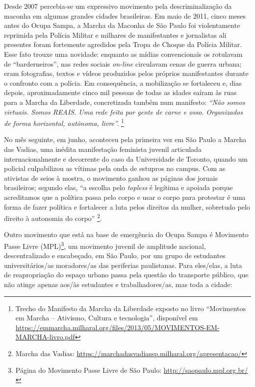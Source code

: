 Desde 2007 percebia-se um expressivo movimento pela descriminalização da
maconha em algumas grandes cidades brasileiras. Em maio de 2011, cinco
meses antes do Ocupa Sampa, a Marcha da Maconha de São Paulo foi
violentamente reprimida pela Polícia Militar e milhares de manifestantes
e jornalistas ali presentes foram fortemente agredidos pela Tropa de
Choque da Polícia Militar. Esse fato trouxe uma novidade: enquanto as
mídias convencionais os rotulavam de ``barderneiros'', nas redes sociais
\emph{on-line} circulavam cenas de guerra urbana; eram fotografias,
textos e vídeos produzidos pelos próprios manifestantes durante o
confronto com a polícia. Em consequência, a mobilização se fortaleceu e,
dias depois, aproximadamente cinco mil pessoas de todas as idades saíram
às ruas para a Marcha da Liberdade, concretizada também num manifesto:
\emph{``Não somos virtuais. Somos REAIS. Uma rede feita por gente de
carne e osso. Organizados de forma horizontal, autônoma, livre''.}
\footnote{Trecho do Manifesto da Marcha da Liberdade exposto no livro
  ``Movimentos em Marcha -- Ativismo, Cultura e tecnologia'', disponível
  em
  \url{https://emmarcha.milharal.org/files/2013/05/MOVIMENTOS-EM-MARCHA-livro.pdf}}

No mês seguinte, em junho, aconteceu pela primeira vez em São Paulo a
Marcha das Vadias, uma inédita manifestação feminista juvenil articulada
internacionalmente e decorrente do caso da Universidade de Toronto,
quando um policial culpabilizou as vítimas pela onda de estupros no
campus. Com as ativistas de seios à mostra, o movimento ganhou as
páginas dos jornais brasileiros; segundo elas, ``a escolha pelo
\emph{topless} é legítima e apoiada porque acreditamos que a política
passa pelo corpo e usar o corpo para protestar é uma forma de fazer
política e fortalecer a luta pelos direitos da mulher, sobretudo pelo
direito à autonomia do corpo'' \footnote{Marcha das Vadias:
  \url{https://marchadasvadiassp.milharal.org/apresentacao/}}.

Outro movimento que está na base de emergência do Ocupa Sampa é
Movimento Passe Livre (MPL)\footnote{Página do Movimento Passe Livre de
  São Paulo: \url{http://saopaulo.mpl.org.br/}}, um movimento juvenil de
amplitude nacional, descentralizado e encabeçado, em São Paulo, por um
grupo de estudantes universitários/as moradores/as das periferias
paulistanas. Para eles/elas, a luta de reapropriação do espaço urbano
passa pela questão do transporte público, que não atinge apenas aos/às
estudantes e trabalhadores/as, mas toda a cidade:

